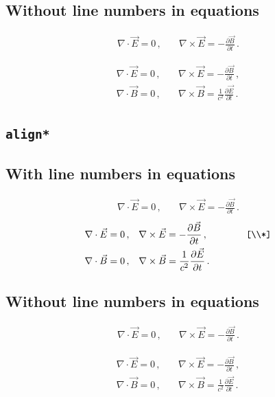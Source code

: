 \subsection*{Without line numbers in equations}
\nextlipsum
\begin{linenomath*}
\begin{align}
  \nabla \cdot \vec E = 0 \,, &\quad \nabla \times \vec E = - \frac{\partial \vec B}{\partial t} \,.
\end{align}
\end{linenomath*}
\nextlipsum
\begin{linenomath*}
\begin{align}
  \nabla \cdot \vec E = 0 \,, &\quad \nabla \times \vec E = - \frac{\partial \vec B}{\partial t} \,, \\
  \nabla \cdot \vec B = 0 \,, &\quad \nabla \times \vec B = \frac{1}{c^2} \frac{\partial \vec E}{\partial t} \,.
\end{align}
\end{linenomath*}
\nextlipsum

\subsection*{\texttt{align*}}

\subsection*{With line numbers in equations}
\nextlipsum
\begin{align*}
  \nabla \cdot \vec E = 0 \,, &\quad \nabla \times \vec E = - \frac{\partial \vec B}{\partial t} \,.
\end{align*}
\nextlipsum
\begin{align*}
  \nabla \cdot \vec E = 0 \,, &\quad \nabla \times \vec E = - \frac{\partial \vec B}{\partial t} \,, \qquad\qquad\texttt{[\textbackslash\textbackslash{}*]}\\*
  \nabla \cdot \vec B = 0 \,, &\quad \nabla \times \vec B = \frac{1}{c^2} \frac{\partial \vec E}{\partial t} \,.
\end{align*}
\nextlipsum

\subsection*{Without line numbers in equations}
\nextlipsum
\begin{linenomath*}
\begin{align*}
  \nabla \cdot \vec E = 0 \,, &\quad \nabla \times \vec E = - \frac{\partial \vec B}{\partial t} \,.
\end{align*}
\end{linenomath*}
\nextlipsum
\begin{linenomath*}
\begin{align*}
  \nabla \cdot \vec E = 0 \,, &\quad \nabla \times \vec E = - \frac{\partial \vec B}{\partial t} \,, \\
  \nabla \cdot \vec B = 0 \,, &\quad \nabla \times \vec B = \frac{1}{c^2} \frac{\partial \vec E}{\partial t} \,.
\end{align*}
\end{linenomath*}
\nextlipsum

